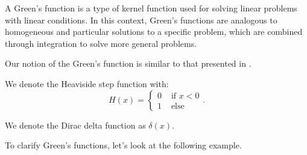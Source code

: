 \documentclass[a4paper,12pt]{article}
\begin{document}
A Green's function is a type of kernel function used
for solving linear problems with linear conditions. In this context,
Green's functions are analogous to homogeneous and particular solutions
to a specific problem, which are combined through integration to solve
more general problems.

\begin{related}
    Our notion of the Green's function is similar to that presented
    in \cite{hwang_simulationtabulation_2001}.
\end{related}


\begin{notation}[$H$]
    We denote the Heaviside step function with:
    \begin{equation}
        H(x) = \begin{cases}
            0 & \text{ if } x<0 \\
            1 & \text{ else }
        \end{cases}.
    \end{equation}
\end{notation}

\begin{notation}[$\delta$]
    We denote the Dirac delta function as $\delta(x)$.
\end{notation}


To clarify Green's functions, let's look at the following example.
\end{document}
